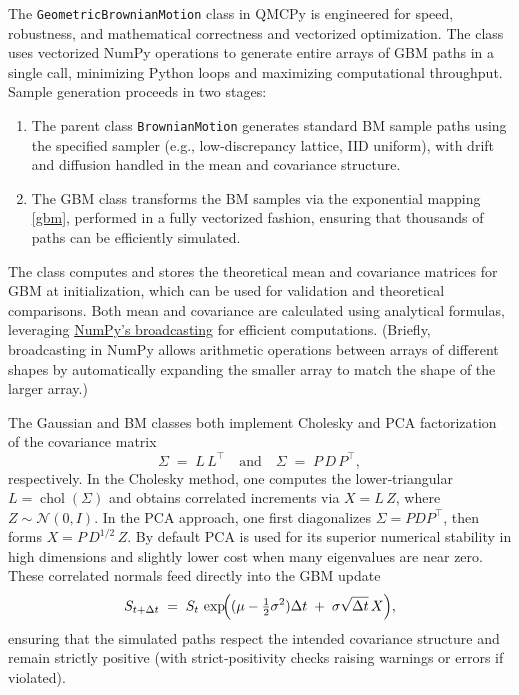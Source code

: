 The \texttt{GeometricBrownianMotion} class in QMCPy is engineered for speed,
robustness, and mathematical correctness and vectorized optimization. The class
uses vectorized NumPy operations to generate entire arrays of GBM paths in a
single call, minimizing Python loops and maximizing computational throughput.
Sample generation proceeds in two stages:
\begin{enumerate}
\item 
The parent class \texttt{BrownianMotion} generates standard BM sample paths
using the specified sampler (e.g., low-discrepancy lattice, IID uniform), with
drift and diffusion handled in the mean and covariance structure.
\item  The GBM class transforms the BM samples via the exponential mapping
\eqref{gbm}, performed in a fully vectorized fashion, ensuring that thousands of
paths can be efficiently simulated.
\end{enumerate}
The class computes and stores the theoretical mean and covariance matrices for
GBM at initialization, which can be used for validation and theoretical
comparisons. Both mean and covariance are calculated using analytical formulas,
leveraging \href{https:/numpy.org/devdocs/user/basics.broadcasting.html}{NumPy’s
broadcasting} for efficient computations. (Briefly, broadcasting in NumPy allows
arithmetic operations between arrays of different shapes by automatically
expanding the smaller array to match the shape of the larger array.)

 The Gaussian and BM classes both implement Cholesky and PCA factorization of
 the covariance matrix
\[
\Sigma \;=\; L\,L^{\!\top}
\quad\text{and}\quad
\Sigma \;=\; P\,D\,P^{\!\top},
\]
respectively.  In the Cholesky method, one computes the lower‐triangular
$L=\operatorname{chol}(\Sigma)$ and obtains correlated increments via $X=L\,Z$,
where $Z\sim\mathcal{N}(0,I)$.  In the PCA approach, one first diagonalizes
$\Sigma=PDP^{\!\top}$, then forms $X = P\,D^{1/2}\,Z$.  By default PCA is used
for its superior numerical stability in high dimensions and slightly lower cost
when many eigenvalues are near zero.  These correlated normals feed directly
into the GBM update
\[
S_{t+\Delta t} \;=\; S_t\,\exp\!\Bigl((\mu - \tfrac12\sigma^2)\Delta t \;+\;\sigma\sqrt{\Delta t}\,X\Bigr),
\]
ensuring that the simulated paths respect the intended covariance structure and
remain strictly positive (with strict‐positivity checks raising warnings or
errors if violated).


